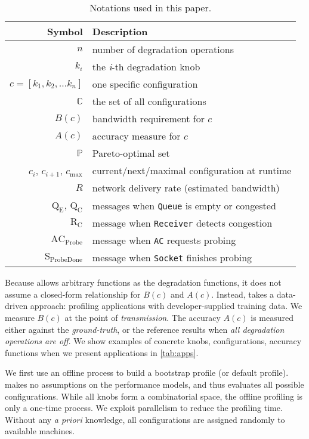 \begin{table}
  \footnotesize
  \centering
  \begin{tabular}{r l}
    \toprule
    \textbf{Symbol} & \textbf{Description} \\
    \midrule
    $n$ & number of degradation operations \\
    $k_i$ & the \textit{i}-th degradation knob \\
    $c = [k_{1}, k_{2}, ... k_{n}]$ & one specific configuration \\
    $\mathbb{C}$ & the set of all configurations \\
    \midrule
    $B(c)$ & bandwidth requirement for $c$ \\
    $A(c)$ & accuracy measure for $c$ \\
    $\mathbb{P}$ & Pareto-optimal set \\
    \midrule
    $c_i$, $c_{i+1}$, $c_{\max}$ & current/next/maximal configuration at runtime \\
    $R$ & network delivery rate (estimated bandwidth) \\
    $\text{Q}_\text{E}$, $\text{Q}_\text{C}$ & messages when \texttt{Queue} is empty or congested \\
    $\text{R}_\text{C}$ & message when \texttt{Receiver} detects congestion \\
    $\text{AC}_\text{Probe}$ & message when \texttt{AC} requests probing \\
    $\text{S}_\text{ProbeDone}$ & message when \texttt{Socket} finishes probing \\
    \bottomrule
  \end{tabular}
  \caption{Notations used in this paper.}
  \label{tab:notations}
  \vspace{-1em}
\end{table}

Because \sysname{} allows arbitrary functions as the degradation functions, it
does not assume a closed-form relationship for $B(c)$ and $A(c)$. Instead,
\sysname{} takes a data-driven approach: profiling applications with
developer-supplied training data.  We measure $B(c)$ at the point of
\textit{transmission}. The accuracy $A(c)$ is measured either against the
\textit{ground-truth}, or the reference results when \textit{all degradation
  operations are off}.  We show examples of concrete knobs, configurations,
accuracy functions when we present applications in \autoref{tab:apps}.

 We first use an offline process to build a bootstrap
profile (or default profile).  \sysname{} makes no assumptions on the
performance models, and thus evaluates all possible configurations.  While all
knobs form a combinatorial space, the offline profiling is only a one-time
process.  We exploit parallelism to reduce the profiling time.  Without any
\textit{a priori} knowledge, all configurations are assigned randomly to
available machines.


